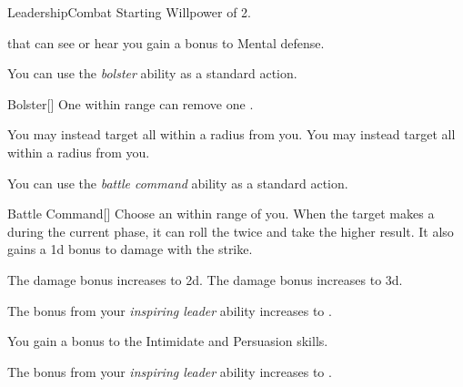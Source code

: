     \begin{feat}{Leadership}{Combat}
        \featpre Starting Willpower of 2.

          that can see or hear you gain a  bonus to Mental defense.

         You can use the \textit{bolster} ability as a standard action.
        \begin{freeability}{Bolster}[]
            One  within \rngclose range can remove one .

            \rankline
             You may instead target all  within a \areamed radius from you.
             You may instead target all  within a \arealarge radius from you.
        \end{freeability}

         You can use the \textit{battle command} ability as a standard action.
        \begin{freeability}{Battle Command}[]
            Choose an  within \rngmed range of you.
            When the target makes a  during the current phase, it can roll the  twice and take the higher result.
            It also gains a \plus1d bonus to damage with the strike.

            \rankline
             The damage bonus increases to \plus2d.
             The damage bonus increases to \plus3d.
        \end{freeability}

         The bonus from your \textit{inspiring leader} ability increases to .

         You gain a  bonus to the Intimidate and Persuasion skills.


         The bonus from your \textit{inspiring leader} ability increases to .
    \end{feat}

